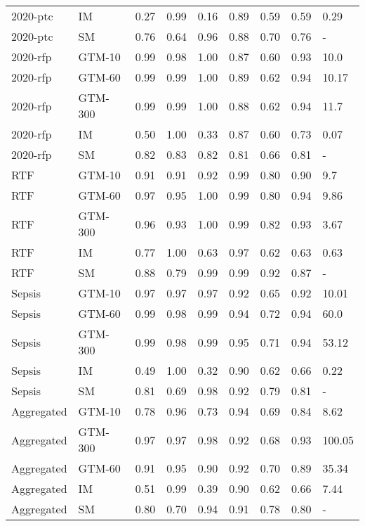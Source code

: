 \begin{tabular}{llrrrrrrl}
2020-ptc & IM & 0.27 & 0.99 & 0.16 & 0.89 & 0.59 & 0.59 & 0.29 \\
2020-ptc & SM & 0.76 & 0.64 & 0.96 & 0.88 & 0.70 & 0.76 & - \\
2020-rfp & GTM-10 & 0.99 & 0.98 & 1.00 & 0.87 & 0.60 & 0.93 & 10.0 \\
2020-rfp & GTM-60 & 0.99 & 0.99 & 1.00 & 0.89 & 0.62 & 0.94 & 10.17 \\
2020-rfp & GTM-300 & 0.99 & 0.99 & 1.00 & 0.88 & 0.62 & 0.94 & 11.7 \\
2020-rfp & IM & 0.50 & 1.00 & 0.33 & 0.87 & 0.60 & 0.73 & 0.07 \\
2020-rfp & SM & 0.82 & 0.83 & 0.82 & 0.81 & 0.66 & 0.81 & - \\
RTF & GTM-10 & 0.91 & 0.91 & 0.92 & 0.99 & 0.80 & 0.90 & 9.7 \\
RTF & GTM-60 & 0.97 & 0.95 & 1.00 & 0.99 & 0.80 & 0.94 & 9.86 \\
RTF & GTM-300 & 0.96 & 0.93 & 1.00 & 0.99 & 0.82 & 0.93 & 3.67 \\
RTF & IM & 0.77 & 1.00 & 0.63 & 0.97 & 0.62 & 0.63 & 0.63 \\
RTF & SM & 0.88 & 0.79 & 0.99 & 0.99 & 0.92 & 0.87 & - \\
Sepsis & GTM-10 & 0.97 & 0.97 & 0.97 & 0.92 & 0.65 & 0.92 & 10.01 \\
Sepsis & GTM-60 & 0.99 & 0.98 & 0.99 & 0.94 & 0.72 & 0.94 & 60.0 \\
Sepsis & GTM-300 & 0.99 & 0.98 & 0.99 & 0.95 & 0.71 & 0.94 & 53.12 \\
Sepsis & IM & 0.49 & 1.00 & 0.32 & 0.90 & 0.62 & 0.66 & 0.22 \\
Sepsis & SM & 0.81 & 0.69 & 0.98 & 0.92 & 0.79 & 0.81 & - \\
Aggregated & GTM-10 & 0.78 & 0.96 & 0.73 & 0.94 & 0.69 & 0.84 & 8.62 \\
Aggregated & GTM-300 & 0.97 & 0.97 & 0.98 & 0.92 & 0.68 & 0.93 & 100.05 \\
Aggregated & GTM-60 & 0.91 & 0.95 & 0.90 & 0.92 & 0.70 & 0.89 & 35.34 \\
Aggregated & IM & 0.51 & 0.99 & 0.39 & 0.90 & 0.62 & 0.66 & 7.44 \\
Aggregated & SM & 0.80 & 0.70 & 0.94 & 0.91 & 0.78 & 0.80 & - \\
\bottomrule
\end{tabular}
